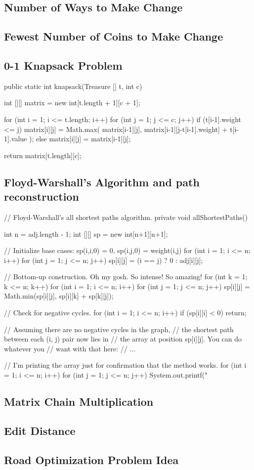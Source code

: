 \subsection*{Number of Ways to Make Change}
\lipsum[1][1-2]
\subsection*{Fewest Number of Coins to Make Change}
\lipsum[1][1-2]
\subsection*{0-1 Knapsack Problem}

public static int knapsack(Treasure [] t, int c)
{
   int [][] matrix = new int[t.length + 1][c + 1];

   for (int i = 1; i <= t.length; i++)
      for (int j = 1; j <= c; j++)
         if (t[i-1].weight <= j)
            matrix[i][j] = Math.max(
               matrix[i-1][j],
               matrix[i-1][j-t[i-1].weight] + t[i-1].value
            );
         else
            matrix[i][j] = matrix[i-1][j];

   return matrix[t.length][c];
}

\subsection*{Floyd-Warshall's Algorithm and path reconstruction}

// Floyd-Warshall's all shortest paths algorithm.
private void allShortestPaths()
{
   int n = adj.length - 1;
   int [][] sp = new int[n+1][n+1];

   // Initialize base cases: sp(i,i,0) = 0, sp(i,j,0) = weight(i,j)
   for (int i = 1; i <= n; i++)
      for (int j = 1; j <= n; j++)
         sp[i][j] = (i == j) ? 0 : adj[i][j];

   // Bottom-up construction. Oh my gosh. So intense! So amazing!
   for (int k = 1; k <= n; k++)
      for (int i = 1; i <= n; i++)
         for (int j = 1; j <= n; j++)
            sp[i][j] = Math.min(sp[i][j], sp[i][k] + sp[k][j]);

   // Check for negative cycles.
   for (int i = 1; i <= n; i++)
      if (sp[i][i] < 0)
         return;
		
   // Assuming there are no negative cycles in the graph,
   // the shortest path between each (i, j) pair now lies in
   // the array at position sp[i][j]. You can do whatever you
   // want with that here:
   // ...

   // I'm printing the array just for confirmation that the method works.
   for (int i = 1; i <= n; i++)
      for (int j = 1; j <= n; j++)
         System.out.printf("%
}

\subsection*{Matrix Chain Multiplication}
\lipsum[1][1-2]
\subsection*{Edit Distance}
\lipsum[1][1-2]
\subsection*{Road Optimization Problem Idea}
\lipsum[1][1-2]
